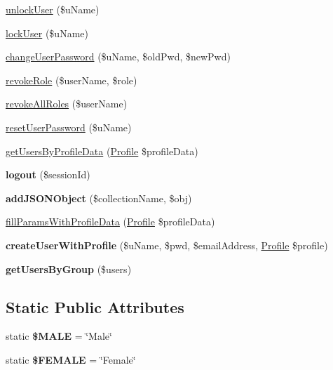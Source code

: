 \begin{DoxyCompactItemize}
\hyperlink{class_user_service_a7651c03b89750f99981976ef7fd3725e}{unlock\+User} (\$u\+Name)
\item 
\hyperlink{class_user_service_a482854ed5da446e1249bc1919f688d6d}{lock\+User} (\$u\+Name)
\item 
\hyperlink{class_user_service_af17489c1b9cb60869820c197a123907d}{change\+User\+Password} (\$u\+Name, \$old\+Pwd, \$new\+Pwd)
\item 
\hyperlink{class_user_service_a1614e4a23175ff9fc041e4e0e28d8e42}{revoke\+Role} (\$user\+Name, \$role)
\item 
\hyperlink{class_user_service_a697bfef929fe31dbd34540bb096f88ef}{revoke\+All\+Roles} (\$user\+Name)
\item 
\hyperlink{class_user_service_a32b211833333d3eb2a867bd58d79113a}{reset\+User\+Password} (\$u\+Name)
\item 
\hyperlink{class_user_service_aa9f0031b88ff72c012208e05ea0fa230}{get\+Users\+By\+Profile\+Data} (\hyperlink{class_profile}{Profile} \$profile\+Data)
\item 
\hypertarget{class_user_service_a7fdad8528118567bdd587b37592c25b8}{{\bfseries logout} (\$session\+Id)}\label{class_user_service_a7fdad8528118567bdd587b37592c25b8}

\item 
\hypertarget{class_user_service_a5821bf72489c15b04e59a24c8beb4766}{{\bfseries add\+J\+S\+O\+N\+Object} (\$collection\+Name, \$obj)}\label{class_user_service_a5821bf72489c15b04e59a24c8beb4766}

\item 
\hyperlink{class_user_service_aed8ac40cf520379acad52833dc333fca}{fill\+Params\+With\+Profile\+Data} (\hyperlink{class_profile}{Profile} \$profile\+Data)
\item 
\hypertarget{class_user_service_a3b02edf7fc8f66f998acf2c3e7c0c135}{{\bfseries create\+User\+With\+Profile} (\$u\+Name, \$pwd, \$email\+Address, \hyperlink{class_profile}{Profile} \$profile)}\label{class_user_service_a3b02edf7fc8f66f998acf2c3e7c0c135}

\item 
\hypertarget{class_user_service_abcb905dd54bb435639a6184758a45b2c}{{\bfseries get\+Users\+By\+Group} (\$users)}\label{class_user_service_abcb905dd54bb435639a6184758a45b2c}

\end{DoxyCompactItemize}
\subsection*{Static Public Attributes}
\begin{DoxyCompactItemize}
\item 
\hypertarget{class_user_service_a77bc41101672c1e89c8575238cf33550}{static {\bfseries \$\+M\+A\+L\+E} = \char`\"{}Male\char`\"{}}\label{class_user_service_a77bc41101672c1e89c8575238cf33550}

\item 
\hypertarget{class_user_service_a2fb4ccd0fab13c8c3c254201f7677d82}{static {\bfseries \$\+F\+E\+M\+A\+L\+E} = \char`\"{}Female\char`\"{}}\label{class_user_service_a2fb4ccd0fab13c8c3c254201f7677d82}

\end{DoxyCompactItemize}
